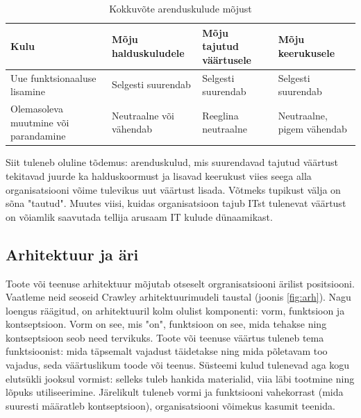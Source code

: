 \documentclass{article}
\begin{document}
\begin{table}
	\begin{center}
		\begin{tabular}{p{3.8cm}p{2.4cm}p{2.1cm}p{2.7cm}}
		\toprule
Kulu & Mõju \mbox{halduskuludele} & Mõju tajutud väärtusele & Mõju \mbox{keerukusele} \\
\midrule

Uue funktsionaaluse \mbox{lisamine} & Selgesti \mbox{suurendab} & Selgesti \mbox{suurendab} & Selgesti \mbox{suurendab} \\
\addlinespace
Olemasoleva muutmine või parandamine & Neutraalne või vähendab & Reeglina \mbox{neutraalne} & Neutraalne, \mbox{pigem} vähendab \\

\bottomrule
		\end{tabular}
		\caption{Kokkuvõte arenduskulude mõjust}
		\label{tab:arendus}
	\end{center}
\end{table}

Siit tuleneb oluline tõdemus: arenduskulud, mis suurendavad tajutud väärtust tekitavad juurde ka halduskoormust ja lisavad keerukust viies seega alla organisatsiooni võime tulevikus uut väärtust lisada. Võtmeks tupikust välja on sõna "tautud". Muutes viisi, kuidas organisatsioon tajub ITst tulenevat väärtust on võiamlik saavutada tellija arusaam IT kulude dünaamikast. 

\subsection{Arhitektuur ja äri}
Toote või teenuse arhitektuur mõjutab otseselt orgranisatsiooni ärilist positsiooni. Vaatleme neid seoseid Crawley arhitektuurimudeli taustal (joonis \ref{fig:arh}). Nagu loengus räägitud, on arhitektuuril kolm olulist komponenti: vorm, funktsioon ja kontseptsioon. Vorm on see, mis "on", funktsioon on see, mida tehakse ning kontseptsioon seob need tervikuks. Toote või teenuse väärtus tuleneb tema funktsioonist: mida täpsemalt vajadust täidetakse ning mida põletavam too vajadus, seda väärtuslikum toode või teenus. Süsteemi kulud tulenevad aga kogu elutsükli jooksul vormist: selleks tuleb hankida materialid, viia läbi tootmine ning lõpuks utiliseerimine. Järelikult tuleneb vormi ja funktsiooni vahekorrast (mida suuresti määratleb kontseptsioon), organisatsiooni võimekus kasumit teenida.
\end{document}
